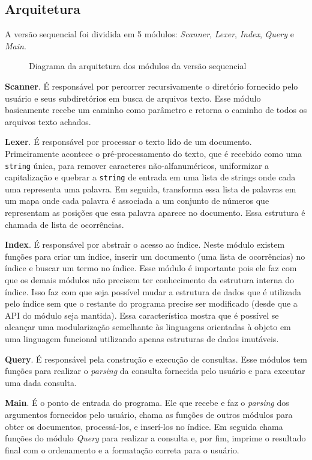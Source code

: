 \subsection{Arquitetura}

A versão sequencial foi dividida em 5 módulos: \emph{Scanner}, \emph{Lexer}, \emph{Index}, \emph{Query} e \emph{Main}. 

\begin{figure}[h]
 \centering
 \def\svgwidth{0.5\columnwidth}
 
 \caption{Diagrama da arquitetura dos módulos da versão sequencial}
\end{figure}

\textbf{Scanner}. É responsável por percorrer recursivamente o diretório fornecido pelo usuário e seus subdiretórios em busca de arquivos texto. Esse módulo basicamente recebe um caminho como parâmetro e retorna o caminho de todos os arquivos texto achados.

\textbf{Lexer}. É responsável por processar o texto lido de um documento. Primeiramente acontece o pré-processamento do texto, que é recebido como uma \verb|string| única, para remover caracteres não-alfanuméricos, uniformizar a capitalização e quebrar a \verb|string| de entrada em uma lista de strings onde cada uma representa uma palavra. Em seguida, transforma essa lista de palavras em um mapa onde cada palavra é associada a um conjunto de números que representam as posições que essa palavra aparece no documento. Essa estrutura é chamada de lista de ocorrências.

\textbf{Index}. É responsável por abstrair o acesso ao índice. Neste módulo existem funções para criar um índice, inserir um documento (uma lista de ocorrências) no índice e buscar um termo no índice. Esse módulo é importante pois ele faz com que os demais módulos não precisem ter conhecimento da estrutura interna do índice. Isso faz com que seja possível mudar a estrutura de dados que é utilizada pelo índice sem que o restante do programa precise ser modificado (desde que a API do módulo seja mantida). Essa característica mostra que é possível se alcançar uma modularização semelhante às linguagens orientadas à objeto em uma linguagem funcional utilizando apenas estruturas de dados imutáveis.

\textbf{Query}. É responsável pela construção e execução de consultas. Esse módulos tem funções para realizar o \emph{parsing} da consulta fornecida pelo usuário e para executar uma dada consulta.

\textbf{Main}. É o ponto de entrada do programa. Ele que recebe e faz o \emph{parsing} dos argumentos fornecidos pelo usuário, chama as funções de outros módulos para obter os documentos, processá-los, e inserí-los no índice. Em seguida chama funções do módulo \emph{Query} para realizar a consulta e, por fim, imprime o resultado final com o ordenamento e a formatação correta para o usuário.


